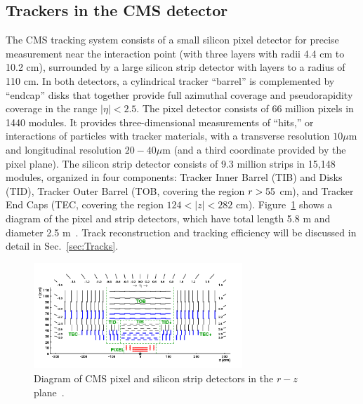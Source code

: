 \subsection{Trackers in the CMS detector}
\label{sec:trackers}

The CMS tracking system consists of a small silicon pixel detector for precise measurement near the interaction point (with three layers with radii 4.4 cm to 10.2 cm), surrounded by a large silicon strip detector with layers to a radius of 110 cm.  In both detectors, a cylindrical tracker ``barrel'' is complemented by ``endcap'' disks that together provide full azimuthal coverage and pseudorapidity coverage in the range $|\eta| < 2.5$.  The pixel detector consists of 66 million pixels in 1440 modules.  It provides three-dimensional measurements of ``hits,'' or interactions of particles with tracker materials, with a transverse resolution $10 \mu$m and longitudinal resolution $20 - 40 \mu$m (and a third coordinate provided by the pixel plane).  The silicon strip detector consists of 9.3 million strips in 15,148 modules, organized in four components:  Tracker Inner Barrel (TIB) and Disks (TID), Tracker Outer Barrel (TOB, covering the region $r > 55 \rm$ cm), and Tracker End Caps (TEC, covering the region $124 < |z| < 282$ cm).  Figure~\ref{fig:tracker} shows a diagram of the pixel and strip detectors, which have total length 5.8 m and diameter 2.5 m~\cite{Chatrchyan:2014fea}.  Track reconstruction and tracking efficiency will be discussed in detail in Sec.~\ref{sec:Tracks}.


\begin{figure}[hbtp]
\begin{center}
\includegraphics[width=0.7\textwidth]{figures/Detector/figs_2011_cmsTracker_TrackerLayoutNew.png}
\caption[Diagram of CMS trackers]{Diagram of CMS pixel and silicon strip detectors in the $r-z$ plane~\cite{Chatrchyan:2014fea}.}
\label{fig:tracker}
\end{center}
\end{figure}



